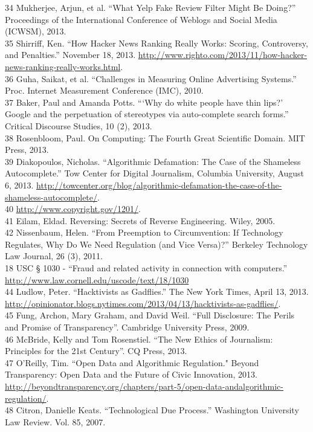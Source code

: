 34 Mukherjee, Arjun, et al. ``What Yelp Fake Review Filter Might Be Doing?'' Proceedings of the International Conference of Weblogs and Social Media (ICWSM), 2013. \\
35 Shirriff, Ken. ``How Hacker News Ranking Really Works: Scoring, Controversy, and Penalties.'' November 18, 2013. \href{http://www.righto.com/2013/11/how-hacker-news-ranking-really-works.html}{http://www.righto.com/2013/11/how-hacker-news-ranking-really-works.html}. \\
36 Guha, Saikat, et al. ``Challenges in Measuring Online Advertising Systems.'' Proc. Internet Measurement Conference (IMC), 2010. \\
37 Baker, Paul and Amanda Potts. ``‘Why do white people have thin lips?' Google and the perpetuation of stereotypes via auto-complete search forms.'' Critical Discourse Studies, 10 (2), 2013. \\
38 Rosenbloom, Paul. On Computing: The Fourth Great Scientific Domain. MIT Press, 2013. \\
39 Diakopoulos, Nicholas. ``Algorithmic Defamation: The Case of the Shameless Autocomplete.'' Tow Center for Digital Journalism, Columbia University, August 6, 2013. \href{http://towcenter.org/blog/algorithmic-defamation-the-case-of-the-shameless-autocomplete/}{http://towcenter.org/blog/algorithmic-defamation-the-case-of-the-shameless-autocomplete/}. \\
40 \href{http://www.copyright.gov/1201/}{http://www.copyright.gov/1201/}. \\
41 Eilam, Eldad. Reversing: Secrets of Reverse Engineering. Wiley, 2005. \\
42 Nissenbaum, Helen. ``From Preemption to Circumvention: If Technology Regulates, Why Do We Need Regulation (and Vice Versa)?'' Berkeley Technology Law Journal, 26 (3), 2011. \\
18 USC § 1030 - ``Fraud and related activity in connection with computers.'' \href{http://www.law.cornell.edu/uscode/text/18/1030.}{http://www.law.cornell.edu/uscode/text/18/1030}\\
44 Ludlow, Peter. ``Hacktivists as Gadflies.'' The New York Times, April 13, 2013. \href{http://opinionator.blogs.nytimes.com/2013/04/13/hacktivists-as-gadflies/}{http://opinionator.blogs.nytimes.com/2013/04/13/hacktivists-as-gadflies/}.\\
45 Fung, Archon, Mary Graham, and David Weil. ``Full Disclosure: The Perils and Promise of Transparency''. Cambridge University Press, 2009.\\
46 McBride, Kelly and Tom Rosenstiel. ``The New Ethics of Journalism: Principles for the 21st Century''. CQ Press, 2013.\\
47 O’Reilly, Tim. ``Open Data and Algorithmic Regulation." Beyond Transparency: Open Data and the Future of Civic Innovation, 2013. \href{http://beyondtransparency.org/chapters/part-5/open-data-andalgorithmic-regulation/}{http://beyondtransparency.org/chapters/part-5/open-data-andalgorithmic-regulation/}.\\
48 Citron, Danielle Keats. ``Technological Due Process.'' Washington University Law Review.
Vol. 85, 2007.\\
